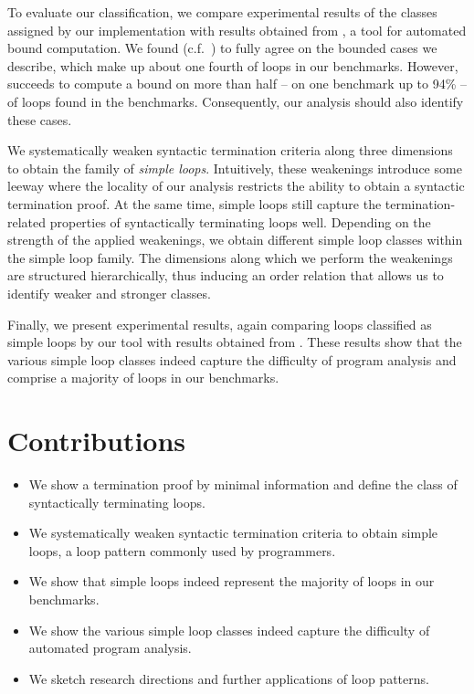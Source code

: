 To evaluate our classification, we compare experimental results of the classes assigned by our implementation \sloopy{} with results obtained from \loopus{} \cite{DBLP:conf/sas/ZulegerGSV11}, a tool for automated bound computation. We found (c.f.\ ) \loopus{} to fully agree on the bounded cases we describe, which make up about one fourth of loops in our benchmarks. However, \loopus{} succeeds to compute a bound on more than half -- on one benchmark up to 94\% -- of loops found in the benchmarks. Consequently, our analysis should also identify these cases.

We systematically weaken syntactic termination criteria along three dimensions to obtain the family of \emph{simple loops}. Intuitively, these weakenings introduce some leeway where the locality of our analysis restricts the ability to obtain a syntactic termination proof. At the same time, simple loops still capture the termination-related properties of syntactically terminating loops well. Depending on the strength of the applied weakenings, we obtain different simple loop classes within the simple loop family. The dimensions along which we perform the weakenings are structured hierarchically, thus inducing an order relation that allows us to identify weaker and stronger classes.

Finally, we present experimental results, again comparing loops classified as simple loops by our tool \sloopy{} with results obtained from \loopus{}. These results show that the various simple loop classes indeed capture the difficulty of program analysis and comprise a majority of loops in our benchmarks.

\section{Contributions}

\begin{itemize}
    \item We show a termination proof by minimal information and define the class of syntactically terminating loops.
    \item We systematically weaken syntactic termination criteria to obtain simple loops, a loop pattern commonly used by programmers.
    \item We show that simple loops indeed represent the majority of loops in our benchmarks.
    \item We show the various simple loop classes indeed capture the difficulty of automated program analysis.
    \item We sketch research directions and further applications of loop patterns.
\end{itemize}

